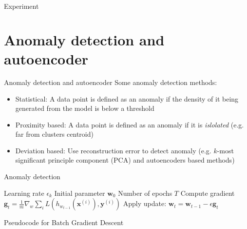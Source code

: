 \documentclass{beamer}
\begin{document}
\begin{frame}{Experiment}

\end{frame}

\section{Anomaly detection and autoencoder}
\begin{frame}{Anomaly detection and autoencoder}
Some anomaly detection methods:
\begin{itemize}
	\item Statistical: A data point is defined as an anomaly if the density of it being generated from the model is below a threshold
	\item Proximity based: A data point is defined as an anomaly if it is \textit{islolated} (e.g. far from clusters centroid)
	\item Deviation based: Use reconstruction error to detect anomaly (e.g. $k$-most significant principle component (PCA) and autoencoders based methods)
\end{itemize}
\end{frame}

\begin{frame}{Anomaly detection}  
\begin{algorithm}[H]
	\begin{algorithmic}
		\REQUIRE Learning rate $\epsilon_k$
		\REQUIRE Initial parameter $\bm{w}_0$
		\REQUIRE Number of epochs $T$
		\STATE Compute gradient $\bm{g}_t=\frac{1}{m}\nabla_w\sum_i L(h_{w_{t-1}}(\bm{x}^{(i)}), \bm{y}^{(i)})$ 
		\STATE Apply update: $\bm{w}_t=\bm{w}_{t-1}-\epsilon \bm{g}_t$
		\ENDFOR
	\end{algorithmic}
	\caption{Pseudocode for Batch Gradient Descent}
	\label{alg:seq}
\end{algorithm}
\end{frame}
\end{document}
